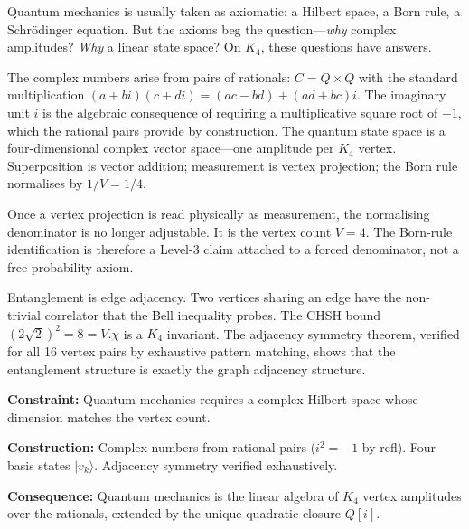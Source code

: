 \documentclass[11pt,a4paper]{book}
\def\cdot{.}%
\def\mathbb#1{#1}%
\def\texttt#1{#1}%
\begin{document}
Quantum mechanics is usually taken as axiomatic: a Hilbert space, a Born rule,
a Schr\"odinger equation.  But the axioms beg the question---\emph{why} complex
amplitudes?  \emph{Why} a linear state space?  On $K_4$, these questions have
answers.

The complex numbers arise from pairs of rationals:
$\mathbb{C} = \mathbb{Q} \times \mathbb{Q}$ with the standard multiplication
$(a + bi)(c + di) = (ac - bd) + (ad + bc)i$.  The imaginary unit $i$ is the
algebraic consequence of requiring a multiplicative square root of $-1$, which
the rational pairs provide by construction.  The quantum state space is a
four-dimensional complex vector space---one amplitude per $K_4$ vertex.
Superposition is vector addition; measurement is vertex projection; the Born
rule normalises by $1/V = 1/4$.

Once a vertex projection is read physically as measurement, the normalising denominator is no longer adjustable. It is the vertex count $V=4$. The Born-rule identification is therefore a Level-3 claim attached to a forced denominator, not a free probability axiom.

Entanglement is edge adjacency.  Two vertices sharing an edge have the
non-trivial correlator that the Bell inequality probes.  The CHSH bound
$(2\sqrt{2})^2 = 8 = V \cdot \chi$ is a $K_4$ invariant.  The adjacency
symmetry theorem, verified for all 16 vertex pairs by exhaustive pattern
matching, shows that the entanglement structure is exactly the graph
adjacency structure.

\textbf{Constraint:}
Quantum mechanics requires a complex Hilbert space whose dimension matches
the vertex count.

\textbf{Construction:}
Complex numbers from rational pairs ($i^2 = -1$ by \texttt{refl}).
Four basis states $|v_k\rangle$.  Adjacency symmetry verified exhaustively.

\textbf{Consequence:}
Quantum mechanics is the linear algebra of $K_4$ vertex amplitudes over
the rationals, extended by the unique quadratic closure $\mathbb{Q}[i]$.
\end{document}
